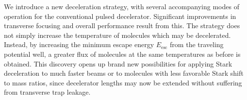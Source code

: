 \documentclass[%
 reprint,
 amsmath,amssymb,
 aps,
prl,
]{revtex4-1}
\begin{document}



We introduce a new deceleration strategy, with several accompanying modes of operation for the conventional pulsed decelerator. 
Significant improvements in transverse focusing and overall performance result from this.
The strategy does not simply increase the temperature of molecules which may be decelerated.
Instead, by increasing the minimum escape energy $E_\text{esc}$ from the traveling potential well, a greater flux of molecules at the same temperatures as before is obtained.
This discovery opens up brand new possibilities for applying Stark deceleration to much faster beams or to molecules with less favorable Stark shift to mass ratios, since decelerator lengths may now be extended without suffering from transverse trap leakage.
\end{document}
